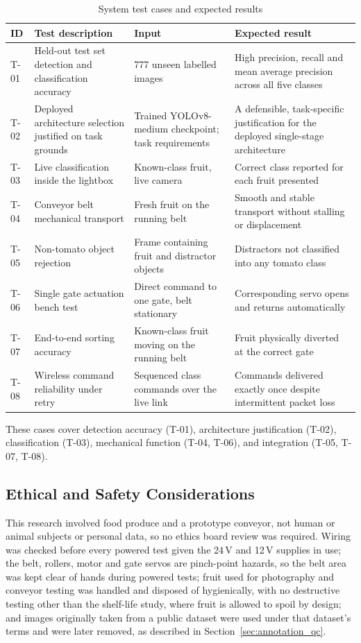 \begin{table}[H]
\caption{System test cases and expected results}
\label{tab:testcases}
\centering
\begin{tabularx}{\textwidth}{l p{4.0cm} p{3.2cm} X}
\toprule
\textbf{ID} & \textbf{Test description} & \textbf{Input} & \textbf{Expected result} \\
\midrule
T-01 & Held-out test set detection and classification accuracy & 777 unseen labelled images & High precision, recall and mean average precision across all five classes \\
T-02 & Deployed architecture selection justified on task grounds & Trained YOLOv8-medium checkpoint; task requirements & A defensible, task-specific justification for the deployed single-stage architecture \\
T-03 & Live classification inside the lightbox & Known-class fruit, live camera & Correct class reported for each fruit presented \\
T-04 & Conveyor belt mechanical transport & Fresh fruit on the running belt & Smooth and stable transport without stalling or displacement \\
T-05 & Non-tomato object rejection & Frame containing fruit and distractor objects & Distractors not classified into any tomato class \\
T-06 & Single gate actuation bench test & Direct command to one gate, belt stationary & Corresponding servo opens and returns automatically \\
T-07 & End-to-end sorting accuracy & Known-class fruit moving on the running belt & Fruit physically diverted at the correct gate \\
T-08 & Wireless command reliability under retry & Sequenced class commands over the live link & Commands delivered exactly once despite intermittent packet loss \\
\bottomrule
\end{tabularx}
\end{table}

These cases cover detection accuracy (T-01), architecture justification (T-02), classification (T-03), mechanical function (T-04, T-06), and integration (T-05, T-07, T-08).

\subsection{Ethical and Safety Considerations}
\label{sec:m_ethics}

This research involved food produce and a prototype conveyor, not human or animal subjects or personal data, so no ethics board review was required. Wiring was checked before every powered test given the 24\,V and 12\,V supplies in use; the belt, rollers, motor and gate servos are pinch-point hazards, so the belt area was kept clear of hands during powered tests; fruit used for photography and conveyor testing was handled and disposed of hygienically, with no destructive testing other than the shelf-life study, where fruit is allowed to spoil by design; and images originally taken from a public dataset were used under that dataset's terms and were later removed, as described in Section~\ref{sec:annotation_qc}.

\clearpage
